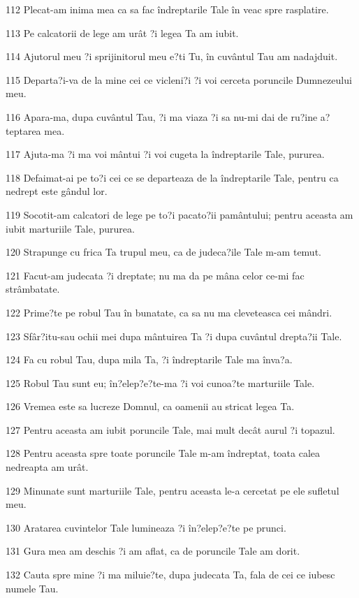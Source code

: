 \par 112 Plecat-am inima mea ca sa fac îndreptarile Tale în veac spre rasplatire.
\par 113 Pe calcatorii de lege am urât ?i legea Ta am iubit.
\par 114 Ajutorul meu ?i sprijinitorul meu e?ti Tu, în cuvântul Tau am nadajduit.
\par 115 Departa?i-va de la mine cei ce vicleni?i ?i voi cerceta poruncile Dumnezeului meu.
\par 116 Apara-ma, dupa cuvântul Tau, ?i ma viaza ?i sa nu-mi dai de ru?ine a?teptarea mea.
\par 117 Ajuta-ma ?i ma voi mântui ?i voi cugeta la îndreptarile Tale, pururea.
\par 118 Defaimat-ai pe to?i cei ce se departeaza de la îndreptarile Tale, pentru ca nedrept este gândul lor.
\par 119 Socotit-am calcatori de lege pe to?i pacato?ii pamântului; pentru aceasta am iubit marturiile Tale, pururea.
\par 120 Strapunge cu frica Ta trupul meu, ca de judeca?ile Tale m-am temut.
\par 121 Facut-am judecata ?i dreptate; nu ma da pe mâna celor ce-mi fac strâmbatate.
\par 122 Prime?te pe robul Tau în bunatate, ca sa nu ma cleveteasca cei mândri.
\par 123 Sfâr?itu-sau ochii mei dupa mântuirea Ta ?i dupa cuvântul drepta?ii Tale.
\par 124 Fa cu robul Tau, dupa mila Ta, ?i îndreptarile Tale ma înva?a.
\par 125 Robul Tau sunt eu; în?elep?e?te-ma ?i voi cunoa?te marturiile Tale.
\par 126 Vremea este sa lucreze Domnul, ca oamenii au stricat legea Ta.
\par 127 Pentru aceasta am iubit poruncile Tale, mai mult decât aurul ?i topazul.
\par 128 Pentru aceasta spre toate poruncile Tale m-am îndreptat, toata calea nedreapta am urât.
\par 129 Minunate sunt marturiile Tale, pentru aceasta le-a cercetat pe ele sufletul meu.
\par 130 Aratarea cuvintelor Tale lumineaza ?i în?elep?e?te pe prunci.
\par 131 Gura mea am deschis ?i am aflat, ca de poruncile Tale am dorit.
\par 132 Cauta spre mine ?i ma miluie?te, dupa judecata Ta, fala de cei ce iubesc numele Tau.
